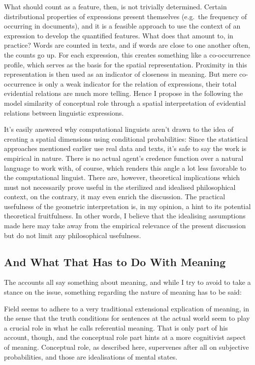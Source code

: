 \documentclass[11pt, a4paper]{article}
\begin{document}
What should count as a feature, then, is not trivially determined. Certain distributional properties of expressions present themselves (e.g.\ the frequency of occurring in documents), and it is a feasible approach to use the context of an expression to develop the quantified features. What does that amount to, in practice? Words are counted in texts, and if words are close to one another often, the counts go up. For each expression, this creates something like a co-occurrence profile, which serves as the basis for the spatial representation. Proximity in this representation is then used as an indicator of closeness in meaning. But mere co-occurrence is only a weak indicator for the relation of expressions, their total evidential relations are much more telling. Hence I propose in the following the model similarity of conceptual role through a spatial interpretation of evidential relations between linguistic expressions. 

It's easily answered why computational linguists aren't drawn to the idea of creating a spatial dimensions using conditional probabilities: Since the statistical approaches mentioned earlier use real data and texts, it's safe to say the work is empirical in nature. There is no actual agent's credence function over a natural language to work with, of course, which renders this angle a lot less favorable to the computational linguist. There are, however, theoretical implications which must not necessarily prove useful in the sterilized and idealised philosophical context, on the contrary, it may even enrich the discussion. The practical usefulness of the geometric interpretation is, in my opinion, a hint to its potential theoretical fruitfulness. In other words, I believe that the idealising assumptions made here may take away from the empirical relevance of the present discussion but do not limit any philosophical usefulness.

\subsection{And What That Has to Do With Meaning}

The accounts all say something about meaning, and while I try to avoid to take a stance on the issue, something regarding the nature of meaning has to be said: 

Field seems to adhere to a very traditional extensional explication of meaning, in the sense that the truth conditions for sentences at the actual world seem to play a crucial role in what he calls referential meaning. That is only part of his account, though, and the conceptual role part hints at a more cognitivist aspect of meaning. Conceptual role, as described here, supervenes after all on subjective probabilities, and those are idealisations of mental states. 
\end{document}
